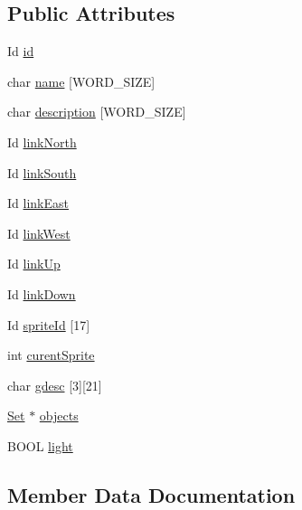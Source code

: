 \subsection*{Public Attributes}
\begin{DoxyCompactItemize}
\item 
Id \hyperlink{struct__Space_a70cb461deb9ac073e401b607339b567f}{id}
\item 
char \hyperlink{struct__Space_a4e8775f2ba9ae19392f9942dbb5f5ec0}{name} \mbox{[}W\+O\+R\+D\+\_\+\+S\+I\+ZE\mbox{]}
\item 
char \hyperlink{struct__Space_a2a50aacb78d1d0f65f5b14f94ed81d80}{description} \mbox{[}W\+O\+R\+D\+\_\+\+S\+I\+ZE\mbox{]}
\item 
Id \hyperlink{struct__Space_a3f2998ecc940b5cdab73e38188886902}{link\+North}
\item 
Id \hyperlink{struct__Space_a642c37093a6ccc0203a655c3fc0a93d3}{link\+South}
\item 
Id \hyperlink{struct__Space_adbf9d4d57d188ef48d3e361fb77a92cf}{link\+East}
\item 
Id \hyperlink{struct__Space_aaa6f5fa10a67afc466e3b272099dc398}{link\+West}
\item 
Id \hyperlink{struct__Space_a07ec5f33b91b44a690dbac835a4292f6}{link\+Up}
\item 
Id \hyperlink{struct__Space_a683015bc7d7265b94ebd10c46aa0a95b}{link\+Down}
\item 
Id \hyperlink{struct__Space_a5a86c929d4043837ee01ea1b14749970}{sprite\+Id} \mbox{[}17\mbox{]}
\item 
int \hyperlink{struct__Space_a36bf40fe118f520ea514bf1a3a106d9f}{curent\+Sprite}
\item 
char \hyperlink{struct__Space_a0a71c4c0a4a1698f7d860ba5b80beb7f}{gdesc} \mbox{[}3\mbox{]}\mbox{[}21\mbox{]}
\item 
\hyperlink{struct__Set}{Set} $\ast$ \hyperlink{struct__Space_a661ed8b0fc8085b6db70188aa5085625}{objects}
\item 
B\+O\+OL \hyperlink{struct__Space_a15f20d8ccdec846b9a4f77464748bff5}{light}
\end{DoxyCompactItemize}


\subsection{Member Data Documentation}
\mbox{\label{struct__Space_a36bf40fe118f520ea514bf1a3a106d9f}} 
